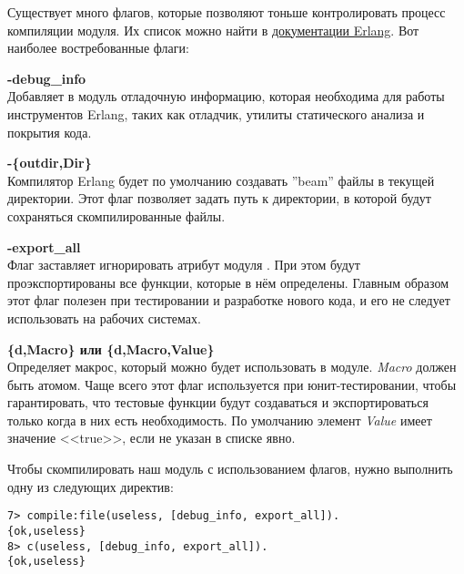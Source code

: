 Существует много флагов, которые позволяют тоньше контролировать процесс компиляции модуля.
Их список можно найти в \href{http://erlang.org/doc/man/compile.html}{документации Erlang}.
Вот наиболее востребованные флаги:\\ 

\begin{minipage}{0.9\linewidth}
    \textbf{-debug\_info}\\ 
    Добавляет в модуль отладочную информацию, которая необходима для работы инструментов Erlang, таких как отладчик, утилиты статического анализа и покрытия кода.
\end{minipage}

\begin{minipage}{0.9\linewidth}
    \textbf{-\{outdir,Dir\}}\\ 
    Компилятор Erlang будет по умолчанию создавать ''beam'' файлы в текущей директории.
    Этот флаг позволяет задать путь к директории, в которой будут сохраняться скомпилированные файлы.
\end{minipage}

\begin{minipage}{0.9\linewidth}
    \textbf{-export\_all}\\ 
    Флаг заставляет игнорировать атрибут модуля .
    При этом будут проэкспортированы все функции, которые в нём определены.
    Главным образом этот флаг полезен при тестировании и разработке нового кода, и его не следует использовать на рабочих системах.
\end{minipage}

\begin{minipage}{0.9\linewidth}
    \textbf{\{d,Macro\} или \{d,Macro,Value\}}\\ 
    Определяет макрос, который можно будет использовать в модуле.
    \emph{Macro} должен быть атомом.
    Чаще всего этот флаг используется при юнит\--тестировании, чтобы гарантировать, что тестовые функции будут создаваться и экспортироваться только когда в них есть необходимость.
    По умолчанию элемент \emph{Value} имеет значение <<true>>, если не указан в списке явно.
\end{minipage}

Чтобы скомпилировать наш модуль  с использованием флагов, нужно выполнить одну из следующих директив:
\begin{lstlisting}[style=erlang]
7> compile:file(useless, [debug_info, export_all]).
{ok,useless}
8> c(useless, [debug_info, export_all]).
{ok,useless}
\end{lstlisting}

